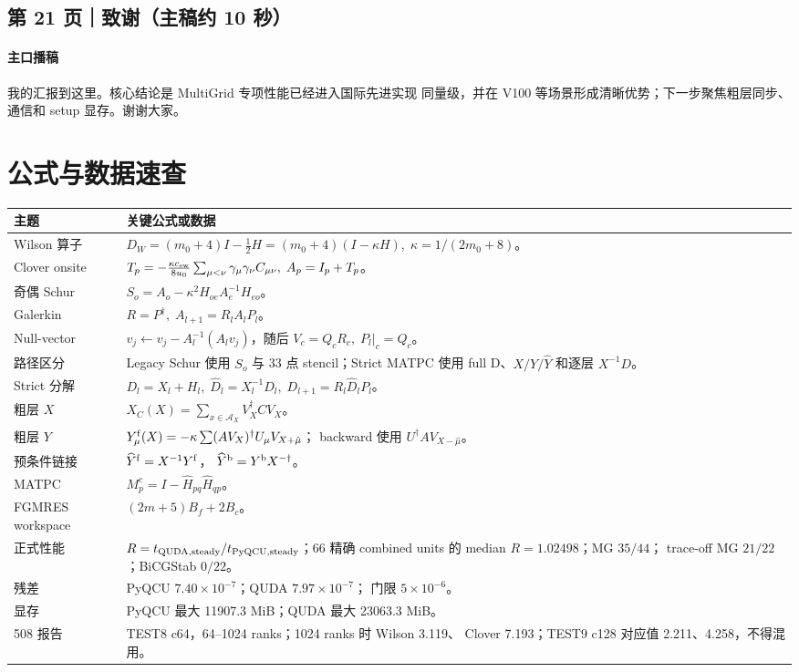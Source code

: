 \documentclass[UTF8,a4paper,11pt,fontset=none]{ctexart}
\begin{document}
\subsection{第 21 页｜致谢（主稿约 10 秒）}

\paragraph{主口播稿}
我的汇报到这里。核心结论是 MultiGrid 专项性能已经进入国际先进实现
同量级，并在 V100 等场景形成清晰优势；下一步聚焦粗层同步、通信和
setup 显存。谢谢大家。

\section{公式与数据速查}

\begin{longtable}{@{}L{0.25\textwidth}L{0.67\textwidth}@{}}
\toprule
主题 & 关键公式或数据\\
\midrule
Wilson 算子 &
\(D_W=(m_0+4)I-\frac12H=(m_0+4)(I-\kappa H),\;
\kappa=1/(2m_0+8)\)。\\
Clover onsite &
\(T_p=-\frac{\kappa c_{\rm sw}}{8u_0}\sum_{\mu<\nu}
\gamma_\mu\gamma_\nu C_{\mu\nu},\;A_p=I_p+T_p\)。\\
奇偶 Schur &
\(S_o=A_o-\kappa^2H_{oe}A_e^{-1}H_{eo}\)。\\
Galerkin &
\(R=P^\dagger,\;A_{l+1}=R_lA_lP_l\)。\\
Null-vector &
\(v_j\leftarrow v_j-A_l^{-1}(A_lv_j)\)，随后
\(V_c=Q_cR_c,\;P_l|_c=Q_c\)。\\
路径区分 &
Legacy Schur 使用 \(S_o\) 与 33 点 stencil；Strict MATPC 使用
full D、\(X/Y/\widehat Y\) 和逐层 \(X^{-1}D\)。\\
Strict 分解 &
\(D_l=X_l+H_l,\;\widehat D_l=X_l^{-1}D_l,\;
D_{l+1}=R_l\widehat D_lP_l\)。\\
粗层 \(X\) &
\(X_C(X)=\sum_{x\in\mathcal A_X}V_X^\dagger C V_X\)。\\
粗层 \(Y\) &
\(Y_\mu^{\rm f}(X)=-\kappa\sum(AV_X)^\dagger U_\mu V_{X+\hat\mu}\)；
backward 使用 \(U^\dagger AV_{X-\hat\mu}\)。\\
预条件链接 &
\(\widehat Y^{\rm f}=X^{-1}Y^{\rm f}\)，
\(\widehat Y^{\rm b}=Y^{\rm b}X^{-\dagger}\)。\\
MATPC &
\(M_p^c=I-\widehat H_{pq}\widehat H_{qp}\)。\\
FGMRES workspace &
\((2m+5)B_f+2B_c\)。\\
正式性能 &
\(R=t_{\rm QUDA,steady}/t_{\rm PyQCU,steady}\)；66 精确
combined units 的 median \(R=1.02498\)；MG \(35/44\)；
trace-off MG \(21/22\)；BiCGStab \(0/22\)。\\
残差 &
PyQCU \(7.40\times10^{-7}\)；QUDA \(7.97\times10^{-7}\)；
门限 \(5\times10^{-6}\)。\\
显存 &
PyQCU 最大 11907.3 MiB；QUDA 最大 23063.3 MiB。\\
508 报告 &
TEST8 c64，64--1024 ranks；1024 ranks 时 Wilson 3.119、
Clover 7.193；TEST9 c128 对应值 2.211、4.258，不得混用。\\
\bottomrule
\end{longtable}
\end{document}
